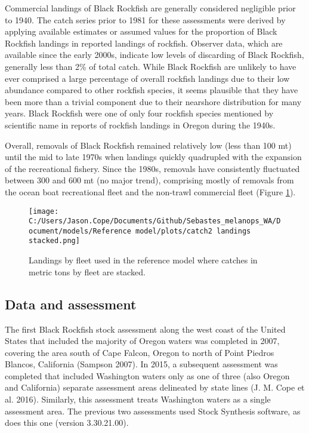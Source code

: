 \documentclass[11pt,
  english,
  letterpaper,
]{article}
\begin{document}
Commercial landings of Black Rockfish are generally considered negligible prior to 1940. The catch series prior to 1981 for these assessments were derived by applying available estimates or assumed values for the proportion of Black Rockfish landings in reported landings of rockfish. Observer data, which are available since the early 2000s, indicate low levels of discarding of Black Rockfish, generally less than 2\% of total catch. While Black Rockfish are unlikely to have ever comprised a large percentage of overall rockfish landings due to their low abundance compared to other rockfish species, it seems plausible that they have been more than a trivial component due to their nearshore distribution for many years. Black Rockfish were one of only four rockfish species mentioned by scientific name in reports of rockfish landings in Oregon during the 1940s.

Overall, removals of Black Rockfish remained relatively low (less than 100 mt) until the mid to late 1970s when landings quickly quadrupled with the expansion of the recreational fishery. Since the 1980s, removals have consistently fluctuated between 300 and 600 mt (no major trend), comprising mostly of removals from the ocean boat recreational fleet and the non-trawl commercial fleet (Figure \ref{fig:es-catch}).



\begin{figure}
\centering
\texttt{[image: C:/Users/Jason.Cope/Documents/Github/Sebastes\_melanops\_WA/Document/models/Reference model/plots/catch2 landings stacked.png]}
\caption{Landings by fleet used in the reference model where catches in metric tons by fleet are stacked.\label{fig:es-catch}}
\end{figure}

\clearpage

\hypertarget{data-and-assessment}{%
\subsection*{Data and assessment}\label{data-and-assessment}}

The first Black Rockfish stock assessment along the west coast of the United States that included the majority of Oregon waters was completed in 2007, covering the area south of Cape Falcon, Oregon to north of Point Piedros Blancos, California (Sampson 2007). In 2015, a subsequent assessment was completed that included Washington waters only as one of three (also Oregon and California) separate assessment areas delineated by state lines (J. M. Cope et al. 2016). Similarly, this assessment treats Washington waters as a single assessment area. The previous two assessments used Stock Synthesis software, as does this one (version 3.30.21.00).
\end{document}
